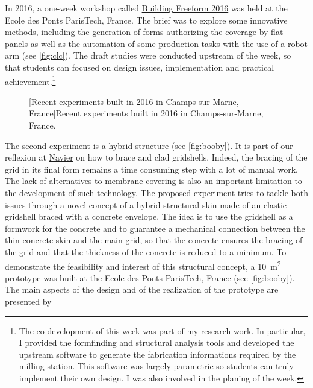 In 2016, a one-week workshop called \href{http://thinkshell.fr/freeform-wooden-gridshell-2016/}{Building Freeform 2016} was held at the Ecole des Ponts ParisTech, France. The brief was to explore some innovative methods, including the generation of forms authorizing the coverage by flat panels as well as the automation of some production tasks with the use of a robot arm (see \cref{fig:clc}). The draft studies were conducted upstream of the week, so that students can focused on design issues, implementation and practical achievement.\footnote{The co-development of this week was part of my research work. In particular, I provided the formfinding and structural analysis tools and developed the upstream software to generate the fabrication informations required by the milling station. This software was largely parametric so students can truly implement their own design. I was also involved in the planing of the week.}
\begin{figure}[h]
		\hspace*{\fill}
		\vspace{10pt}
		[Recent experiments built in 2016 in Champs-sur-Marne, France]{Recent experiments built in 2016 in Champs-sur-Marne, France.}
		\label{fig:experiments}    
\end{figure}

The second experiment is a hybrid structure (see \cref{fig:booby}). It is part of our reflexion at \href{http://navier.enpc.fr}{Navier} on how to brace and clad gridshells. Indeed, the bracing of the grid in its final form remains a time consuming step with a lot of manual work. The lack of alternatives to membrane covering is also an important limitation to the development of such technology. The proposed experiment tries to tackle both issues through a novel concept of a hybrid structural skin made of an elastic gridshell braced with a concrete envelope. The idea is to use the gridshell as a formwork for the concrete and to guarantee a mechanical connection between the thin concrete skin and the main grid, so that the concrete ensures the bracing of the grid and that the thickness of the concrete is reduced to a minimum. To demonstrate the feasibility and interest of this structural concept, a \SI{10}{m^2} prototype was built at the Ecole des Ponts ParisTech, France (see \cref{fig:booby}). The main aspects of the design and of the realization of the prototype are presented by 

